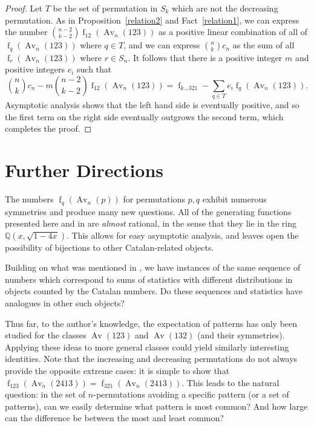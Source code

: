 \documentclass[11pt]{article} %
\theoremstyle{plain}
\theoremstyle{definition}
\newcommand{\Avn}{\Av_n(123)}
\DeclareMathOperator{\Av}{Av}
\DeclareMathOperator{\num}{f}
\begin{document}
  \begin{proof}
    Let $T$ be the set of permutation in $S_k$ which are not the
    decreasing permutation.  As in Proposition~\ref{relation2} and
    Fact~\ref{relation1},  we can express the number
    $\binom{n-2}{k-2}\num_{12}(\Avn)$ as a positive linear combination of
    all of $\num_{q} (\Avn)$ where $q \in T$, and we can express
    $\binom{n}{k} c_n$ as the sum of all $\num_r (\Avn)$ where $r
    \in S_n$.
    It follows that there is a positive integer $m$ and positive
    integers $e_i$ such that
    $$ \binom{n}{k} c_n - m\binom{n-2}{k-2} \num_{12} (\Avn) =
      \num_{k \ldots 321} - \sum_{q \in T} e_i \num_q (\Avn).$$
    Asymptotic analysis shows that the left hand side is eventually
    positive, and so the first term on the right side eventually
    outgrows the second term, which completes the proof.
  \end{proof}



\section{Further Directions}

  The numbers $\num_q (\Av_n (p))$ for permutations $p,q$ exhibit numerous
  symmetries and produce many new questions. All of the generating functions
  presented here and in \cite{bona10} are \emph{almost} rational, in the
  sense that they lie in the ring $\mathbb{Q}(x,\sqrt{1-4x})$. This
  allows for easy asymptotic analysis, and leaves open the possibility
  of bijections to other Catalan-related objects.

  Building on what was mentioned in \cite{bona12}, we have instances
  of the same sequence of numbers which correspond to sums of statistics
  with different distributions in objects counted by the Catalan
  numbers.  Do these sequences and statistics have analogues in other
  such objects?

  Thus far, to the author's knowledge, the expectation of patterns
  has only been studied for the classes $\Av (123)$ and $\Av (132)$
  (and their symmetries). Applying these ideas to more general classes could
  yield similarly interesting identities. Note that the increasing and
  decreasing permutations do not always provide the opposite extreme
  cases: it is simple to show that $\num_{123}(\Av_n (2413)) =
  \num_{321}(\Av_n(2413))$. This leads to the natural question: in the
  set of $n$-permutations avoiding a specific pattern (or a set of
  patterns), can we easily determine what pattern is most common? And
  how large can the difference be between the most and least common?
\end{document}
